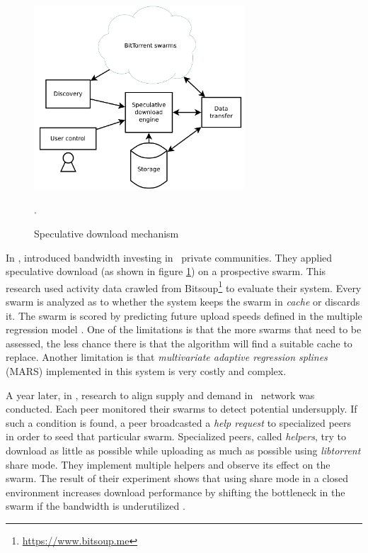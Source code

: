\begin{figure}[h]
	\centering
	\includegraphics[width=0.7\textwidth]{pics/SDE2013.png}
	\caption{Speculative download mechanism \cite{2013:investmentcm:capota}}.
	\label{fig:sde13}
\end{figure}

In \citeyear{2013:investmentcm:capota}, \citeauthor{2013:investmentcm:capota} introduced bandwidth investing in \bt~private communities. They applied speculative download (as shown in figure \ref{fig:sde13}) on a prospective swarm. This research used activity data crawled from Bitsoup\footnote{\url{https://www.bitsoup.me}} to evaluate their system. Every swarm is analyzed as to whether the system keeps the swarm in \textit{cache} or discards it. The swarm is scored by predicting future upload speeds defined in the multiple regression model \cite{2013:investmentcm:capota}. One of the limitations is that the more swarms that need to be assessed, the less chance there is that the algorithm will find a suitable cache to replace. Another limitation is that \textit{multivariate adaptive regression splines} (MARS) implemented in this system is very costly and complex.

A year later, in \citeyear{2014:bwmarket:capota},  research to align supply and demand in \bt~network was conducted. Each peer monitored their swarms to detect potential undersupply. If such a condition is found, a peer broadcasted a \textit{help request} to specialized peers in order to seed that particular swarm. Specialized peers, called \textit{helpers}, try to download as little as possible while uploading as much as possible using \textit{libtorrent} share mode. They implement multiple helpers and observe its effect on the swarm. The result of their experiment shows that using share mode in a closed environment increases download performance  by shifting the bottleneck in the swarm if the bandwidth is underutilized \cite{2014:bwmarket:capota}. 

